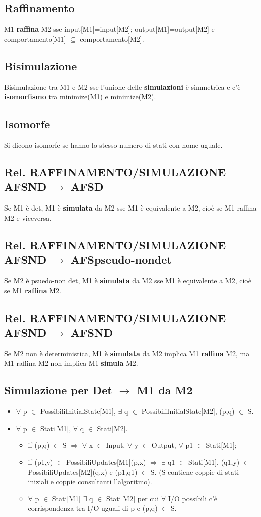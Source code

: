 \documentclass[a4paper]{article}
\begin{document}
\subsection{Raffinamento}M1 \textbf{raffina} M2 sse input[M1]=input[M2]; output[M1]=output[M2] e comportamento[M1] $\subseteq$ comportamento[M2].
\subsection{Bisimulazione}Bisimulazione tra M1 e M2 sse l'unione delle \textbf{simulazioni} è simmetrica e c'è \textbf{isomorfismo} tra minimize(M1) e minimize(M2).
\subsection{Isomorfe}Si dicono isomorfe se hanno lo stesso numero di stati con nome uguale.
\subsection{Rel. RAFFINAMENTO/SIMULAZIONE AFSND $\rightarrow$ AFSD} Se M1 è det, M1 è \textbf{simulata} da M2 sse M1 è equivalente a M2, cioè se M1 raffina M2 e viceversa.
\subsection{Rel. RAFFINAMENTO/SIMULAZIONE AFSND $\rightarrow$ AFSpseudo-nondet} Se M2 è psuedo-non det, M1 è \textbf{simulata} da M2 sse M1 è equivalente a M2, cioè se M1 \textbf{raffina} M2.
\subsection{Rel. RAFFINAMENTO/SIMULAZIONE AFSND $\rightarrow$ AFSND} Se M2 non è deterministica, M1 è \textbf{simulata} da M2 implica M1 \textbf{raffina} M2, ma M1 raffina M2 non implica M1 \textbf{simula} M2.
\subsection{Simulazione per Det $\rightarrow$ M1 da M2}
\begin{itemize}
\item $\forall$ p $\in$  PossibiliInitialState[M1], $\exists$ q $\in$ PossibiliInitialState[M2], (p,q) $\in$ S.
\item $\forall$ p $\in$  Stati[M1], $\forall$ q $\in$ Stati[M2].
\begin{itemize}
\item if (p,q) $\in$ S $\Rightarrow$ $\forall$ x $\in$ Input, $\forall$ y $\in$ Output, $\forall$ p1 $\in$  Stati[M1];
\item if (p1,y) $\in$ PossibiliUpdates[M1](p,x) $\Rightarrow$ $\exists$ q1 $\in$ Stati[M1], (q1,y) $\in$ PossibiliUpdates[M2](q,x) e (p1,q1) $\in$ S. (S contiene coppie di stati iniziali e coppie consultanti l'algoritmo).
\item $\forall$ p $\in$ Stati[M1] $\exists$ q $\in$ Stati[M2] per cui $\forall$ I/O possibili c'è corrispondenza tra I/O uguali di p e (p,q) $\in$ S. 
\end{itemize}
\end{itemize}
\end{document}
